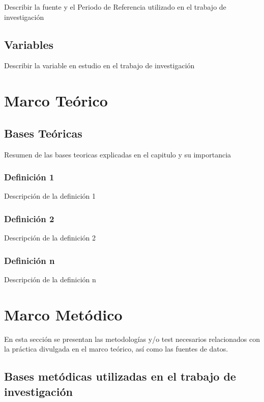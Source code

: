 \documentclass[oneside,11pt]{Latex/Classes/PhDthesisPSnPDF}
\begin{document}
Describir la fuente y el Periodo de Referencia utilizado en el trabajo
de investigación

\section{Variables}

Describir la variable en estudio en el trabajo de investigación

\chapter{Marco Teórico}

\section{Bases Teóricas}

Resumen de las bases teoricas explicadas en el capitulo y su
importancia\\

\subsection{Definición 1}

Descripción de la definición 1\\

\subsection{Definición 2}

Descripción de la definición 2\\

\subsection{Definición n}

Descripción de la definición n\\

\chapter{Marco Metódico}

En esta sección se presentan las metodologías y/o test necesarios
relacionados con la práctica divulgada en el marco teórico, así como las
fuentes de datos.

\section{Bases metódicas utilizadas en el trabajo de investigación}
\end{document}

